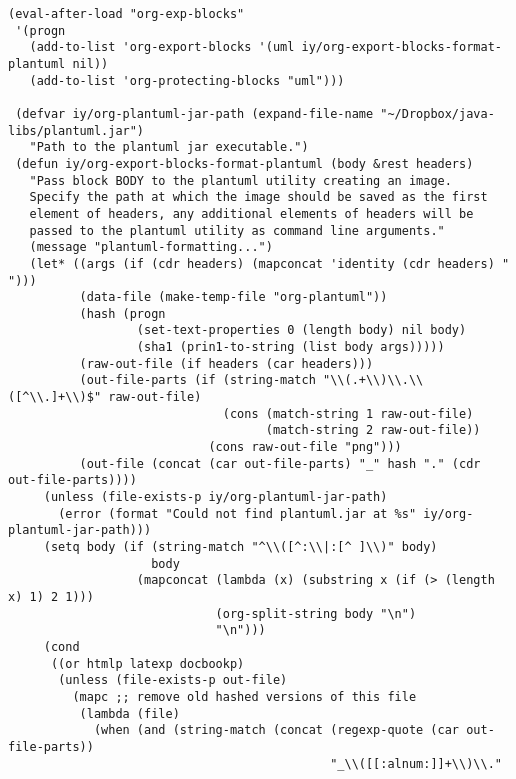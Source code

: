 \documentclass[11pt]{article}
\begin{document}
\begin{verbatim}
(eval-after-load "org-exp-blocks"
 '(progn
   (add-to-list 'org-export-blocks '(uml iy/org-export-blocks-format-plantuml nil))
   (add-to-list 'org-protecting-blocks "uml")))

 (defvar iy/org-plantuml-jar-path (expand-file-name "~/Dropbox/java-libs/plantuml.jar")
   "Path to the plantuml jar executable.")
 (defun iy/org-export-blocks-format-plantuml (body &rest headers)
   "Pass block BODY to the plantuml utility creating an image.
   Specify the path at which the image should be saved as the first
   element of headers, any additional elements of headers will be
   passed to the plantuml utility as command line arguments."
   (message "plantuml-formatting...")
   (let* ((args (if (cdr headers) (mapconcat 'identity (cdr headers) " ")))
          (data-file (make-temp-file "org-plantuml"))
          (hash (progn
                  (set-text-properties 0 (length body) nil body)
                  (sha1 (prin1-to-string (list body args)))))
          (raw-out-file (if headers (car headers)))
          (out-file-parts (if (string-match "\\(.+\\)\\.\\([^\\.]+\\)$" raw-out-file)
                              (cons (match-string 1 raw-out-file)
                                    (match-string 2 raw-out-file))
                            (cons raw-out-file "png")))
          (out-file (concat (car out-file-parts) "_" hash "." (cdr out-file-parts))))
     (unless (file-exists-p iy/org-plantuml-jar-path)
       (error (format "Could not find plantuml.jar at %s" iy/org-plantuml-jar-path)))
     (setq body (if (string-match "^\\([^:\\|:[^ ]\\)" body)
                    body
                  (mapconcat (lambda (x) (substring x (if (> (length x) 1) 2 1)))
                             (org-split-string body "\n")
                             "\n")))
     (cond
      ((or htmlp latexp docbookp)
       (unless (file-exists-p out-file)
         (mapc ;; remove old hashed versions of this file
          (lambda (file)
            (when (and (string-match (concat (regexp-quote (car out-file-parts))
                                             "_\\([[:alnum:]]+\\)\\."

\end{verbatim}
\end{document}
